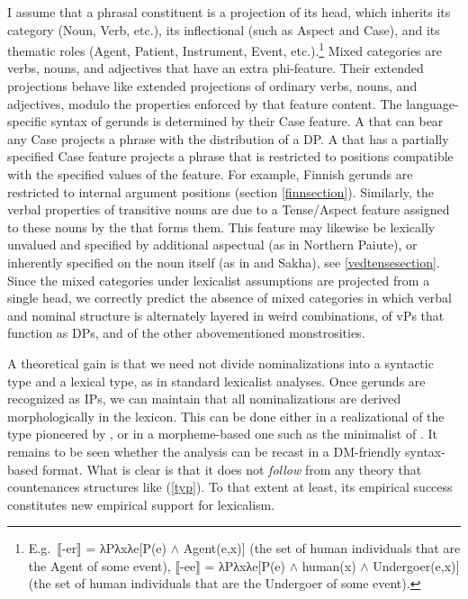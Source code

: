 \documentclass[output=paper,
modfonts
]{LSP/langsci}
\newcommand{\rf}[1]{(\ref{#1})}
\begin{document}
I assume that a phrasal constituent is a projection of its head, which inherits its category
(Noun, Verb, etc.), its inflectional  (such as Aspect and Case), and its thematic roles
(Agent, Patient, Instrument, Event, etc.).\footnote{E.g.\ ⟦-er⟧ =
  λPλxλe[P(e) $\wedge$ Agent(e,x)] (the set of human individuals
  that are the Agent of some event), ⟦-ee⟧ = λPλxλe[P(e) $\wedge$
  human(x) $\wedge$ Undergoer(e,x)] (the set of human individuals that are the Undergoer of
  some event).}  Mixed categories are verbs, nouns, and adjectives that have an extra
phi-feature.  Their extended projections behave like extended projections of ordinary verbs,
nouns, and adjectives, modulo the properties enforced by that feature content.  The
language-specific syntax of gerunds is determined by their Case feature. A  that can bear
any Case projects a phrase with the distribution of a DP.  A  that has a partially
specified Case feature projects a phrase that is restricted to positions compatible with the
specified values of the feature.  For example, Finnish gerunds are restricted to internal
argument positions (section \ref{finnsection}).  Similarly, the verbal properties of transitive
 nouns are due to a Tense/Aspect feature assigned to these nouns by the   that
forms them.  This feature may likewise be lexically unvalued and specified by additional
aspectual  (as in Northern Paiute), or inherently specified on the  noun 
itself (as in  and Sakha), see \ref{vedtensesection}.  Since the mixed categories under
lexicalist assumptions are projected from a single head, we correctly predict the absence of
mixed categories in which verbal and nominal structure is alternately layered in weird
combinations, of vPs that function as DPs, and of the other abovementioned monstrosities.

A theoretical gain is that we need not divide nominalizations into a syntactic type and a
lexical type, as in standard lexicalist analyses.  Once gerunds are recognized as IPs, we can
maintain that all nominalizations are derived morphologically in the lexicon.  This can be done
either in a realizational  of the type pioneered by \citet{anderson1992}, or in a
morpheme-based one such as the minimalist  of \citet{wunderlich1996}.  It remains to be seen
whether the analysis can be recast in a DM-friendly syntax-based format.  What is clear is that
it does not \textit{follow} from any theory that countenances structures like \rf{typ}.  To
that extent at least, its empirical success constitutes new empirical support for lexicalism.
\end{document}
